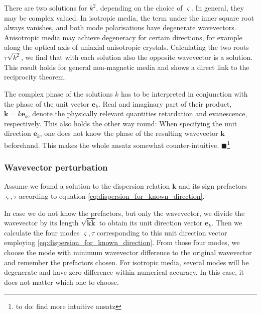 \documentclass[12pt,a4paper,twoside,openright,BCOR10mm,headsepline,titlepage,abstracton,chapterprefix,final]{scrreprt}
\newcommand\Vector[1]{{\mathbf{#1}}}
\newcommand\wavenumber{k}
\newcommand\Wavevector{\Vector{\wavenumber}}
\newcommand{\remark}[1]{{\color{red}$\blacksquare$}\footnote{{\color{red}#1}}}
\begin{document}
There are two solutions for $\wavenumber^2$, depending on the choice of $\varsigma$.
In general, they may be complex valued.
In isotropic media, the term under the inner square root always vanishes, and both mode polarisations have degenerate wavevectors.
Anisotropic media may achieve degeneracy for certain directions, 
for example along the optical axis of uniaxial anisotropic crystals.
Calculating the two roots $\tau \sqrt{\wavenumber^2}$, we find that with each solution
also the opposite wavevector is a solution.
This result holds for general non-magnetic media and shows a direct link to the reciprocity theorem.

The complex phase of the solutions $\wavenumber$ has to be interpreted
in conjunction with the phase of the unit vector $\Vector{e}_\wavenumber$.
Real and imaginary part of their product, $\Wavevector = \wavenumber \Vector{e}_\wavenumber$, 
denote the physically relevant quantities retardation and evanescence, respectively.
This also holds the other way round: When specifying the unit direction $\Vector{e}_\wavenumber$, 
one does not know the phase of the resulting wavevector $\Wavevector$ beforehand.
This makes the whole ansatz somewhat counter-intuitive.
\remark{to do: find more intuitive ansatz}

\subsubsection{Wavevector perturbation}

Assume we found a solution to the dispersion relation $\Wavevector$ and its sign prefactors $\varsigma, \tau$ according to equation \eqref{eq:dispersion_for_known_direction}.

In case we do not know the prefactors, but only the wavevector, we divide the wavevector by its length $\sqrt{\Wavevector \overline{\Wavevector}}$ 
to obtain its unit direction vector $\Vector{e}_\wavenumber$. 
Then we calculate the four modes $\varsigma, \tau$ corresponding to this unit direction vector employing \eqref{eq:dispersion_for_known_direction}.
From those four modes, we choose the mode with minimum wavevector difference to the original wavevector and remember the prefactors chosen.
For isotropic media, several modes will be degenerate and have zero difference within numerical accuracy.
In this case, it does not matter which one to choose.
\end{document}

